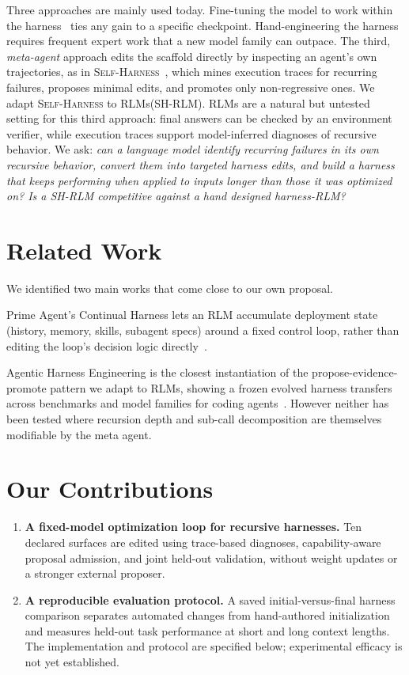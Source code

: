 \documentclass{article}
\newcommand{\rlms}{\textsc{RLM}s\xspace}
\newcommand{\sh}{\textsc{Self-Harness}\xspace}
\begin{document}
Three approaches are mainly used today.
Fine-tuning the model to work within the
harness~\citep{zhang2026harness,yang2026recursive} ties any gain to a specific checkpoint.
Hand-engineering the harness~\citep{alizadeh2026srlm,roy2026ycombinator,lumer2026rah} requires
frequent expert work that a new model family can outpace.
The third, \emph{meta-agent} approach edits the scaffold directly by inspecting an agent's own trajectories, as in \sh{}~\citep{zhang2026selfharness}, which mines execution traces for recurring failures, proposes minimal edits, and promotes only non-regressive ones. We adapt \sh{} to \rlms  (SH-RLM). \rlms are a natural but untested setting for this third approach: final answers can be checked by an environment verifier, while execution traces support model-inferred diagnoses of recursive behavior.
We ask: \emph{can a language model
identify recurring failures in its own recursive behavior, convert them into targeted harness
edits, and build a harness that keeps performing when applied to inputs longer than those it was optimized on? Is a SH-RLM competitive against a hand designed harness-RLM?}

\section{Related Work}

We identified two main works that come close to our own proposal.

Prime Agent's Continual Harness lets an RLM accumulate deployment state (history, memory, skills, subagent specs) around a fixed control loop, rather than editing the loop's decision logic directly~\citep{karten2026primeagent}.

Agentic Harness Engineering is the closest instantiation of the propose-evidence-promote pattern we adapt to RLMs, showing a frozen
evolved harness transfers across benchmarks and model families for coding
agents~\citep{lin2026agenticharness}. However neither has been tested where recursion depth and
sub-call decomposition are themselves modifiable by the meta agent.

\section{Our Contributions}

\begin{enumerate}
\setlength{\itemsep}{1pt}
\setlength{\topsep}{2pt}
\setlength{\parskip}{0pt}
\item \textbf{A fixed-model optimization loop for recursive harnesses.}
Ten declared surfaces are edited using trace-based diagnoses, capability-aware
proposal admission, and joint held-out validation, without weight updates or a
stronger external proposer.
\item \textbf{A reproducible evaluation protocol.}
A saved initial-versus-final harness comparison separates automated changes from
hand-authored initialization and measures held-out task performance at short and
long context lengths. The implementation and protocol are specified below;
experimental efficacy is not yet established.
\end{enumerate}
\end{document}
